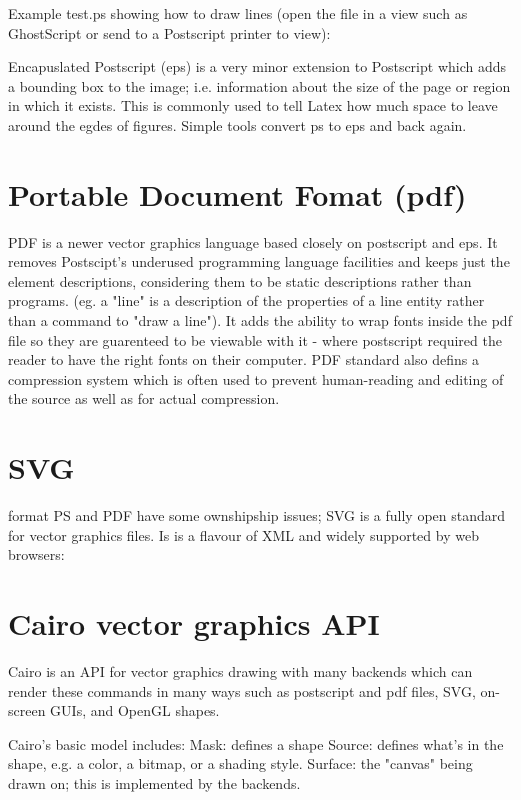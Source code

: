 \documentclass[oneside,english]{scrbook}
\begin{document}
Example test.ps showing how to draw lines (open the file in a view such as GhostScript or send to a Postscript printer to view):


Encapuslated Postscript (eps) is a very minor extension to Postscript which adds a bounding box to the image; i.e. information about the size of the page or region in which it exists. This is commonly used to tell Latex how much space to leave around the egdes of figures. Simple tools convert ps to eps and back again.


\section{Portable Document Fomat (pdf)}

PDF is a newer vector graphics language based closely on postscript and eps.  It removes Postscipt's underused programming language facilities and keeps just the element descriptions, considering them to be static descriptions rather than programs.  (eg. a "line" is a description of the properties of a line entity rather than a command to "draw a line").  It adds the ability to wrap fonts inside the pdf file so they are guarenteed to be viewable with it - where postscript required the reader to have the right fonts on their computer.  PDF standard also defins a compression system which is often used to prevent human-reading and editing of the source as well as for actual compression.




\section{SVG} format
PS and PDF have some ownshipship issues; SVG is a fully open standard for vector graphics files. Is is a flavour of XML and widely supported by web browsers:



\section{Cairo vector graphics API}

Cairo is an API for vector graphics drawing with many backends which can render these commands in many ways such as postscript and pdf files, SVG, on-screen GUIs, and OpenGL shapes.

Cairo's basic model includes:
Mask: defines a shape
Source: defines what's in the shape, e.g. a color, a bitmap, or a shading style.
Surface: the "canvas" being drawn on; this is implemented by the backends.
\end{document}
